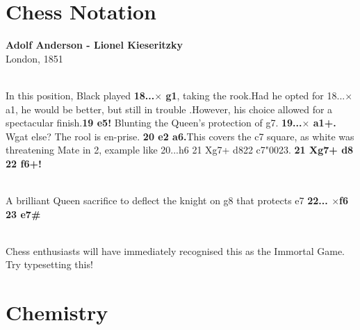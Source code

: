 \documentclass{knittingpattern}
\begin{document}
\section{Chess Notation}
\textbf{Adolf Anderson - Lionel Kieseritzky}\\
London, 1851
\\
\smallskip
\centering
\newchessgame
{}
\showboard
\\
\medskip
\raggedright
In this position, Black played \textbf{18...\symbishop $\times$ g1}, taking the rook.Had he opted for 18...\symqueen $\times$ a1, he would be better, but still in trouble .However, his choice allowed for a spectacular finish.\textbf{19 e5!} Blunting the Queen's protection of g7. \textbf{19...\symqueen $\times$ a1+.} Wgat else? The rool is en-prise. \textbf{20 \symking e2 \symknight a6.}This covers the c7 square, as white was threatening Mate in 2, example like 20...h6 21 \symknight Xg7+ \symking d8\hspace{2mm}22\hspace{2mm} \symbishop c7\char"0023. \textbf{21 \symknight Xg7+ \symking d8 22 \symqueen f6+!}\\
\medskip
\centering
\newchessgame
{}
\showboard
\\
\medskip
\raggedright
A brilliant Queen sacrifice to deflect the knight on g8 that protects e7 \textbf{22... \symknight  $\times$f6 23 \symbishop e7\#}
\\
\medskip
\centering
\newchessgame
{}
\showboard
\\
\medskip
\raggedright
Chess enthusiasts will have immediately recognised this as the Immortal Game. Try typesetting this!
\\
\newpage
\setcounter{section}{2} 
\section{Chemistry}
\end{document}
